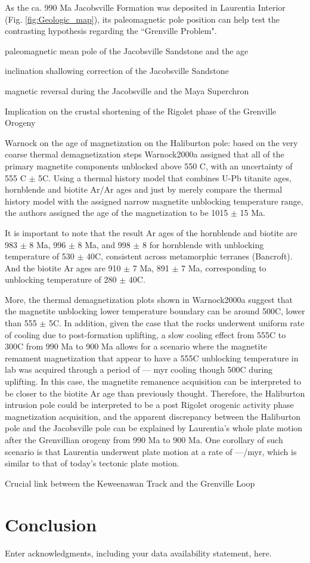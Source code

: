 \documentclass[draft]{agujournal2019}
\begin{document}
As the ca. 990 Ma Jacobsville Formation was deposited in Laurentia Interior (Fig. \ref{fig:Geologic_map}), its paleomagnetic pole position can help test the contrasting hypothesis regarding the ``Grenville Problem". 





paleomagnetic mean pole of the Jacobsville Sandstone and the age

inclination shallowing correction of the Jacobsville Sandstone

magnetic reversal during the Jacobsville and the Maya Superchron

Implication on the crustal shortening of the Rigolet phase of the Grenville Orogeny

Warnock on the age of magnetization on the Haliburton pole: based on the very coarse thermal demagnetization steps Warnock2000a assigned that all of the primary magnetite components unblocked above 550 \textdegree C, with an uncertainty of 555 \textdegree C $\pm$ 5\textdegree C. Using a thermal history model that combines U-Pb titanite ages, hornblende and biotite Ar/Ar ages and just by merely compare the thermal history model with the assigned narrow magnetite unblocking temperature range, the authors assigned the age of the magnetization to be 1015 $\pm$ 15 Ma. 

It is important to note that the result Ar ages of the hornblende and biotite are 983 $\pm$ 8 Ma, 996 $\pm$ 8 Ma, and 998 $\pm$ 8 for hornblende with unblocking temperature of 530 $\pm$ 40\textdegree C, consistent across metamorphic terranes (Bancroft). And the biotite Ar ages are 910 $\pm$ 7 Ma, 891 $\pm$ 7 Ma, corresponding to unblocking temperature of 280 $\pm$ 40\textdegree C. 

More, the thermal demagnetization plots shown in Warnock2000a suggest that the magnetite unblocking lower temperature boundary can be around 500\textdegree C, lower than 555 $\pm$ 5\textdegree C. In addition, given the case that the rocks underwent uniform rate of cooling due to post-formation uplifting, a slow cooling effect from 555\textdegree C to 300\textdegree C from 990 Ma to 900 Ma allows for a scenario where the magnetite remament magnetization that appear to have a 555\textdegree C unblocking temperature in lab was acquired through a period of --- myr cooling though 500\textdegree C during uplifting. In this case, the magnetite remanence acquisition can be interpreted to be closer to the biotite Ar age than previously thought. Therefore, the Haliburton intrusion pole could be interpreted to be a post Rigolet orogenic activity phase magnetization acquisition, and the apparent discrepancy between the Haliburton pole and the Jacobsville pole can be explained by Laurentia's whole plate motion after the Grenvillian orogeny from 990 Ma to 900 Ma. One corollary of such scenario is that Laurentia underwent plate motion at a rate of ---\textdegree/myr, which is similar to that of today's tectonic plate motion. 

Crucial link between the Keweenawan Track and the Grenville Loop


\section*{Conclusion}



\acknowledgments
Enter acknowledgments, including your data availability statement, here.



\end{document}

